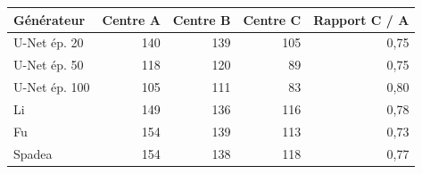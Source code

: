 \begin{tabular}{lrrrr}
\toprule
Générateur & Centre A & Centre B & Centre C & Rapport C / A \\
\midrule
U-Net ép. 20 & 140 & 139 & 105 & 0,75 \\
U-Net ép. 50 & 118 & 120 & 89 & 0,75 \\
U-Net ép. 100 & 105 & 111 & 83 & 0,80 \\
Li & 149 & 136 & 116 & 0,78 \\
Fu & 154 & 139 & 113 & 0,73 \\
Spadea & 154 & 138 & 118 & 0,77 \\
\bottomrule
\end{tabular}
